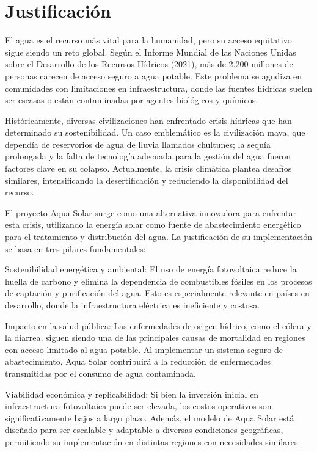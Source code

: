 \documentclass[12pt]{article}
\begin{document}
\newpage
\section{Justificación}
El agua es el recurso más vital para la humanidad, pero su acceso equitativo sigue siendo un reto global. Según el Informe Mundial de las Naciones Unidas sobre el Desarrollo de los Recursos Hídricos (2021), más de 2.200 millones de personas carecen de acceso seguro a agua potable. Este problema se agudiza en comunidades con limitaciones en infraestructura, donde las fuentes hídricas suelen ser escasas o están contaminadas por agentes biológicos y químicos.

Históricamente, diversas civilizaciones han enfrentado crisis hídricas que han determinado su sostenibilidad. Un caso emblemático es la civilización maya, que dependía de reservorios de agua de lluvia llamados chultunes; la sequía prolongada y la falta de tecnología adecuada para la gestión del agua fueron factores clave en su colapso. Actualmente, la crisis climática plantea desafíos similares, intensificando la desertificación y reduciendo la disponibilidad del recurso.

El proyecto Aqua Solar surge como una alternativa innovadora para enfrentar esta crisis, utilizando la energía solar como fuente de abastecimiento energético para el tratamiento y distribución del agua. La justificación de su implementación se basa en tres pilares fundamentales:

Sostenibilidad energética y ambiental: El uso de energía fotovoltaica reduce la huella de carbono y elimina la dependencia de combustibles fósiles en los procesos de captación y purificación del agua. Esto es especialmente relevante en países en desarrollo, donde la infraestructura eléctrica es ineficiente y costosa.

Impacto en la salud pública: Las enfermedades de origen hídrico, como el cólera y la diarrea, siguen siendo una de las principales causas de mortalidad en regiones con acceso limitado al agua potable. Al implementar un sistema seguro de abastecimiento, Aqua Solar contribuirá a la reducción de enfermedades transmitidas por el consumo de agua contaminada.

Viabilidad económica y replicabilidad: Si bien la inversión inicial en infraestructura fotovoltaica puede ser elevada, los costos operativos son significativamente bajos a largo plazo. Además, el modelo de Aqua Solar está diseñado para ser escalable y adaptable a diversas condiciones geográficas, permitiendo su implementación en distintas regiones con necesidades similares.
\end{document}
